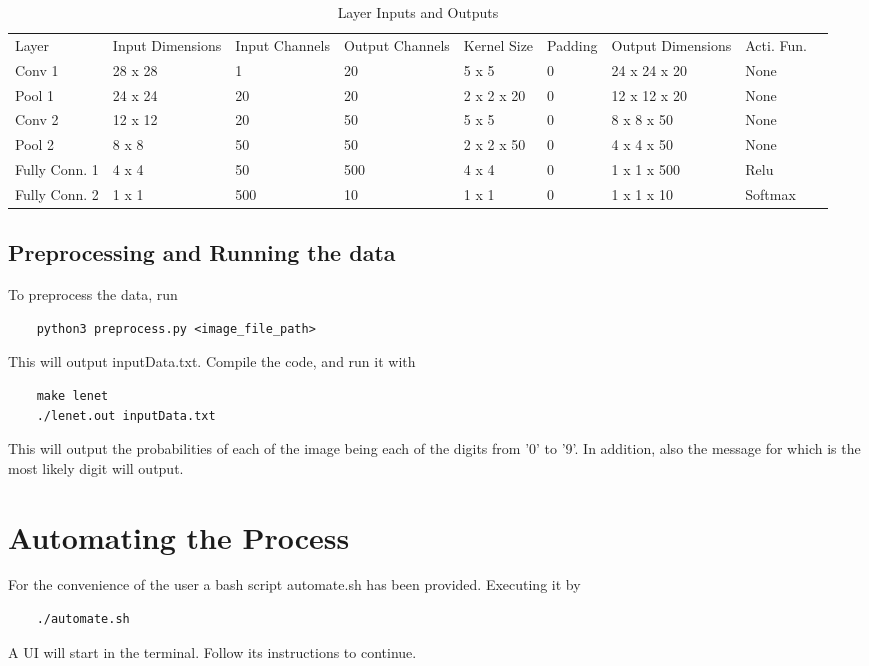 \documentclass[a4paper]{article}
\begin{document}
\begin{center}
\begin{table}[hbt!]
\begin{tabularx}{\linewidth}{|X|X|X|X|X|X|X|X|X}

\cline{1-8}
Layer & Input Dimensions & Input Channels &Output Channels & Kernel Size &Padding &Output Dimensions &Acti. Fun. &  \\ \cline{1-8}
Conv 1& 28 x 28 & 1 & 20 & 5 x 5 & 0 & 24 x 24 x 20 & None   \\ \cline{1-8}
Pool 1& 24 x 24 & 20 & 20 & 2 x 2 x 20 & 0 & 12 x 12 x 20 & None   \\ \cline{1-8}
Conv 2& 12 x 12 & 20 & 50 & 5 x 5 & 0 & 8 x 8 x 50 & None   \\ \cline{1-8}
Pool 2& 8 x 8 & 50 & 50 & 2 x 2 x 50 & 0 & 4 x 4 x 50 & None  \\ \cline{1-8}
Fully Conn. 1& 4 x 4 & 50 & 500 & 4 x 4 & 0 & 1 x 1 x 500 & Relu   \\ \cline{1-8}
Fully Conn. 2& 1 x 1 & 500 & 10 & 1 x 1 & 0 & 1 x 1 x 10 & Softmax   \\ \cline{1-8}
\end{tabularx}
\caption{Layer Inputs and Outputs}\label{tab:title}
\end{table}
\end{center}

\subsection{Preprocessing and Running the data}
To preprocess the data, run
\begin{verbatim}
    python3 preprocess.py <image_file_path>
\end{verbatim}
This will output inputData.txt.
Compile the code, and run it with 
\begin{verbatim}
    make lenet
    ./lenet.out inputData.txt
\end{verbatim}
This will output the probabilities of each of the image being each of the digits from '0' to '9'. In addition, also the message for which is the most likely digit will output.

\section{Automating the Process}
For the convenience of the user a bash script automate.sh has been provided. Executing it by \begin{verbatim}
    ./automate.sh
\end{verbatim}
A UI will start in the terminal. Follow its instructions to continue.
\end{document}

